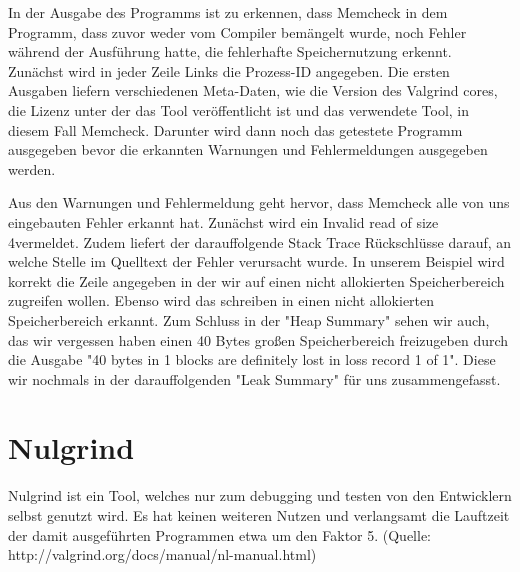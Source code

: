 In der Ausgabe des Programms ist zu erkennen, dass Memcheck in dem Programm, dass zuvor weder vom Compiler bemängelt wurde, noch Fehler während der Ausführung hatte, die fehlerhafte Speichernutzung erkennt.
Zunächst wird in jeder Zeile Links die Prozess-ID angegeben. Die ersten Ausgaben liefern verschiedenen Meta-Daten, wie die Version des Valgrind cores, die Lizenz unter der das Tool veröffentlicht ist und das verwendete Tool, in diesem Fall Memcheck. Darunter wird dann noch das getestete Programm ausgegeben bevor die erkannten Warnungen und Fehlermeldungen ausgegeben werden. 

Aus den Warnungen und Fehlermeldung geht hervor, dass Memcheck alle von uns eingebauten Fehler erkannt hat. Zunächst wird ein \glqq Invalid read of size 4\grqq  vermeldet. Zudem liefert der darauffolgende Stack Trace Rückschlüsse darauf, an welche Stelle im Quelltext der Fehler verursacht wurde. In unserem Beispiel wird korrekt die Zeile angegeben in der wir auf einen nicht allokierten Speicherbereich zugreifen wollen. Ebenso wird das schreiben in einen nicht allokierten Speicherbereich erkannt. Zum Schluss in der "Heap Summary" sehen wir auch, das wir vergessen haben einen 40 Bytes großen Speicherbereich freizugeben durch die Ausgabe "40 bytes in 1 blocks are definitely lost in loss record 1 of 1". Diese wir nochmals in der darauffolgenden "Leak Summary" für uns zusammengefasst.

\section{Nulgrind}
Nulgrind ist ein Tool, welches nur zum debugging und testen von den Entwicklern selbst genutzt wird. Es hat keinen weiteren Nutzen und verlangsamt die Lauftzeit der damit ausgeführten Programmen etwa um den Faktor 5. (Quelle: http://valgrind.org/docs/manual/nl-manual.html)